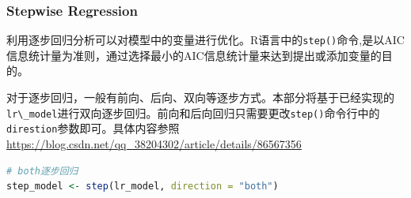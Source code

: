 \documentclass[]{ctexbook}
\newcommand{\passthrough}[1]{#1}
\begin{document}
\hypertarget{stepwise-regression}{%
\subsubsection{Stepwise Regression}\label{stepwise-regression}}

利用逐步回归分析可以对模型中的变量进行优化。R语言中的\passthrough{\lstinline!step()!}命令,是以AIC信息统计量为准则，通过选择最小的AIC信息统计量来达到提出或添加变量的目的。

对于逐步回归，一般有前向、后向、双向等逐步方式。本部分将基于已经实现的\passthrough{\lstinline!lr\_model!}进行双向逐步回归。前向和后向回归只需要更改\passthrough{\lstinline!step()!}命令行中的\passthrough{\lstinline!direstion!}参数即可。具体内容参照 \url{https://blog.csdn.net/qq_38204302/article/details/86567356}

\begin{lstlisting}[language=R]
# both逐步回归
step_model <- step(lr_model, direction = "both")
\end{lstlisting}
\end{document}
